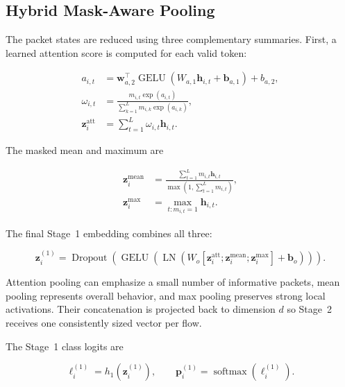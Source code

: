 \documentclass[11pt,fleqn]{report}
\begin{document}
\subsection{Hybrid Mask-Aware Pooling}
\label{subsubsec:hybrid_pooling}

The packet states are reduced using three complementary summaries. First, a
learned attention score is computed for each valid token:

\begin{align}
    a_{i,t}
    &=\mathbf{w}_{a,2}^{\top}
      \operatorname{GELU}
      \left(W_{a,1}\mathbf{h}_{i,t}+\mathbf{b}_{a,1}\right)+b_{a,2},\\
    \omega_{i,t}
    &=\frac{m_{i,t}\exp(a_{i,t})}
      {\sum_{k=1}^{L}m_{i,k}\exp(a_{i,k})},\\
    \mathbf{z}^{\mathrm{att}}_i
    &=\sum_{t=1}^{L}\omega_{i,t}\mathbf{h}_{i,t}.
    \label{eq:stage1_attention_pooling}
\end{align}

The masked mean and maximum are

\begin{align}
    \mathbf{z}^{\mathrm{mean}}_i
    &=\frac{\sum_{t=1}^{L}m_{i,t}\mathbf{h}_{i,t}}
            {\max(1,\sum_{t=1}^{L}m_{i,t})},\\
    \mathbf{z}^{\mathrm{max}}_i
    &=\max_{t:m_{i,t}=1}\mathbf{h}_{i,t}.
    \label{eq:mean_max_pooling}
\end{align}

The final Stage~1 embedding combines all three:

\begin{equation}
    \mathbf{z}^{(1)}_i
    =\operatorname{Dropout}
      \left(
        \operatorname{GELU}
        \left(
          \operatorname{LN}
          \left(
            W_o
            [\mathbf{z}^{\mathrm{att}}_i;
             \mathbf{z}^{\mathrm{mean}}_i;
             \mathbf{z}^{\mathrm{max}}_i]
            +\mathbf{b}_o
          \right)
        \right)
      \right).
    \label{eq:hybrid_pooling}
\end{equation}

Attention pooling can emphasize a small number of informative packets, mean
pooling represents overall behavior, and max pooling preserves strong local
activations. Their concatenation is projected back to dimension $d$ so Stage~2
receives one consistently sized vector per flow.

The Stage~1 class logits are

\begin{equation}
    \boldsymbol{\ell}^{(1)}_i
    =h_1(\mathbf{z}^{(1)}_i),
    \qquad
    \mathbf{p}^{(1)}_i
    =\operatorname{softmax}(\boldsymbol{\ell}^{(1)}_i).
    \label{eq:stage1_classifier}
\end{equation}
\end{document}
